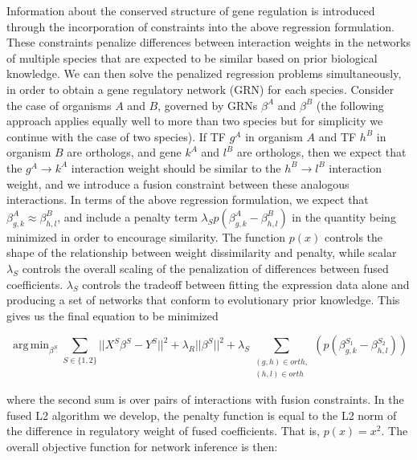 \documentclass[11pt]{article}
\DeclareMathOperator*{\argmin}{arg\,min}
\begin{document}
Information about the conserved structure of gene regulation is introduced through the incorporation of constraints into the above regression formulation. These constraints penalize differences between interaction weights in the networks of multiple species that are expected to be similar based on prior biological knowledge. We can then solve the penalized regression problems simultaneously, in order to obtain a gene regulatory network (GRN) for each species. Consider the case of organisms $A$ and $B$, governed by GRNs $\beta^A$ and $\beta^B$ (the following approach applies equally well to more than two species but for simplicity we continue with the case of two species). If TF $g^A$ in organism $A$ and TF $h^B$ in organism $B$ are orthologs, and gene $k^A$ and $l^B$ are orthologs, then we expect that the $g^A \rightarrow k^A$ interaction weight should be similar to the $h^B \rightarrow l^B$ interaction weight, and we introduce a fusion constraint between these analogous interactions. In terms of the above regression formulation, we expect that $\beta^A_{g,k} \approx \beta^B_{h,l}$, and include a penalty term $\lambda_Sp(\beta^A_{g,k} - \beta^B_{h,l})$ in the quantity being minimized in order to encourage similarity. The function $p(x)$ controls the shape of the relationship between weight dissimilarity and penalty, while scalar $\lambda_S$ controls the overall scaling of the penalization of differences between fused coefficients. $\lambda_S$ controls the tradeoff between fitting the expression data alone and producing a set of networks that conform to evolutionary prior knowledge. This gives us the final equation to be minimized 

\begin{equation}
\argmin_{\beta^S} \displaystyle\sum_{S \in \{1, 2\}} \vert \vert X^S\beta^S - Y^S \vert \vert ^2 + \lambda_R \vert \vert \beta^S \vert \vert ^2 + \lambda_S \displaystyle \sum_{\substack{(g,h) \in orth,\\
 (h,l) \in orth}}(p(\beta^{S_1}_{g,k} - \beta^{S_2}_{h,l}))
\end{equation}

where the second sum is over pairs of interactions with fusion constraints. In the fused L2 algorithm we develop, the penalty function is equal to the L2 norm of the difference in regulatory weight of fused coefficients. That is, $p(x)=x^2$. The overall objective function for network inference is then:
\end{document}

